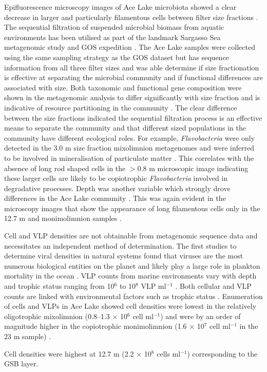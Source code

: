 Epifluorescence microscopy images of Ace Lake microbiota showed a clear decrease in larger and particularly filamentous cells between filter size fractions .
The sequential filtration of suspended microbial biomass from aquatic environments has been utilised as part of the landmark Sargasso Sea metagenomic study \cite{Venter2004} and \ac{GOS} expedition \cite{Rusch2007}.
The Ace Lake samples were collected using the same sampling strategy as the \ac{GOS} dataset but has sequence information from all three filter sizes and was able determine if size fractionation is effective at separating the microbial community and if functional differences are associated with size.
Both taxonomic and functional gene composition were shown in the metagenomic analysis to differ significantly with size fraction and is indicative of resource partitioning in the community \cite{Lauro2011}.
The clear difference between the size fractions indicated the sequential filtration process is an effective means to separate the community and that different sized populations in the community have different ecological roles.
For example, \emph{Flavobacteria} were only detected in the 3.0 \textmu{}m size fraction mixolimnion metagenomes and were inferred to be involved in mineralisation of particulate matter \cite{Lauro2011}.
This correlates with the absence of long rod shaped cells in the $>$0.8 \textmu{}m microscopic image  indicating these larger cells are likely to be copiotrophic \emph{Flavobacteria} involved in degradative processes.
Depth was another variable which strongly drove differences in the Ace Lake community \cite{Lauro2011}.
This was again evident in the microscopy images that show the appearance of long filamentous cells only in the 12.7 m and monimolimnion samples .

Cell and \ac{VLP} densities are not obtainable from metagenomic sequence data and necessitates an independent method of determination.
The first studies to determine viral densities in natural systems found that viruses are the most numerous biological entities on the planet and likely play a large role in plankton mortality in the ocean \cite{Bergh1989,Proctor1990}. 
\ac{VLP} counts from marine environments vary with depth and trophic status ranging from 10$^6$ to 10$^8$ \acs{VLP} ml$^{-1}$ \cite{Suttle2005}.
Both cellular and \ac{VLP} counts are linked with environmental factors such as trophic status \cite{Lauro2009}. 
Enumeration of cells and \acp{VLP} in Ace Lake showed cell densities were lowest in the relatively oligotrophic mixolimnion (0.8--1.3 $\times$ 10$^6$ cell ml$^{-1}$) and were by an order of magnitude higher in the copiotrophic monimolimnion (1.6 $\times$ 10$^7$ cell ml$^{-1}$ in the 23 m sample) .

Cell densities were highest at 12.7 m (2.2 $\times$ 10$^8$ cells ml$^{-1}$) corresponding to the \ac{GSB} layer.


